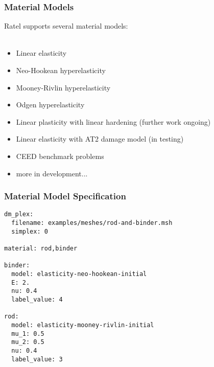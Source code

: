 \documentclass{beamer}
\begin{document}
\begin{frame}
\begin{center}
\frametitle{Material Models}

Ratel supports several material models:\\

~\\

\begin{itemize}

\item Linear elasticity\\

\item Neo-Hookean hyperelasticity\\

\item Mooney-Rivlin hyperelasticity\\

\item Odgen hyperelasticity\\

\item Linear plasticity with linear hardening (further work ongoing)\\

\item Linear elasticity with AT2 damage model (in testing)\\

\item CEED benchmark problems\\

\item more in development...\\

\end{itemize}

\end{center}
\end{frame}


\begin{frame}[fragile]
\begin{center}
\frametitle{Material Model Specification}

{\footnotesize
\begin{lstlisting}[style=yaml]
dm_plex:
  filename: examples/meshes/rod-and-binder.msh
  simplex: 0

material: rod,binder

binder: 
  model: elasticity-neo-hookean-initial
  E: 2.
  nu: 0.4
  label_value: 4

rod:
  model: elasticity-mooney-rivlin-initial
  mu_1: 0.5
  mu_2: 0.5
  nu: 0.4
  label_value: 3
\end{lstlisting}
}

\end{center}
\end{frame}
\end{document}

